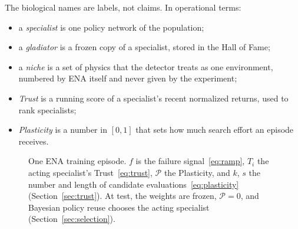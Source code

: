 The biological names are labels, not claims. In operational terms:
\begin{itemize}
\item a \textit{specialist} is one policy network of the population;
\item a \textit{gladiator} is a frozen copy of a specialist, stored in the Hall of Fame;
\item a \textit{niche} is a set of physics that the detector treats as one environment, numbered by ENA itself and never given by the experiment;
\item \textit{Trust} is a running score of a specialist's recent normalized returns, used to rank specialists;
\item \textit{Plasticity} is a number in $[0,1]$ that sets how much search effort an episode receives.
\end{itemize}

\begin{figure}[t]
\centering
{}
\caption{One ENA training episode. $f$ is the failure signal~\eqref{eq:ramp}, $T_i$ the acting specialist's Trust~\eqref{eq:trust}, $\mathcal{P}$ the Plasticity, and $k$, $s$ the number and length of candidate evaluations~\eqref{eq:plasticity} (Section~\ref{sec:trust}). At test, the weights are frozen, $\mathcal{P}=0$, and Bayesian policy reuse chooses the acting specialist (Section~\ref{sec:selection}).}
\label{fig:algorithm}
\end{figure}

